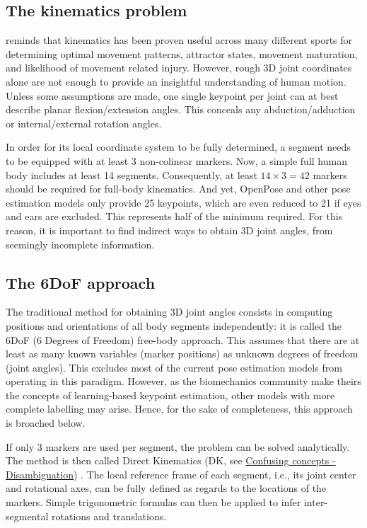 \subsection{The kinematics problem}

\cite{Robertson2013} reminds that kinematics has been proven useful across many different sports for determining optimal movement patterns, attractor states, movement maturation, and likelihood of movement related injury. However, rough 3D joint coordinates alone are not enough to provide an insightful understanding of human motion. Unless some assumptions are made, one single keypoint per joint can at best describe planar flexion/extension angles. This conceals any abduction/adduction or internal/external rotation angles. 

In order for its local coordinate system to be fully determined, a segment needs to be equipped with at least 3 non-colinear markers. Now, a simple full human body includes at least 14 segments. Consequently, at least $14 \times 3 = 42$ markers should be required for full-body kinematics. And yet, OpenPose and other pose estimation models only provide 25 keypoints, which are even reduced to 21 if eyes and ears are excluded. This represents half of the minimum required. For this reason, it is important to find indirect ways to obtain 3D joint angles, from seemingly incomplete information.


\subsection{The 6DoF approach}

The traditional method for obtaining 3D joint angles consists in computing positions and orientations of all body segments independently: it is called the 6DoF (6 Degrees of Freedom) free-body approach. This assumes that there are at least as many known variables (marker positions) as unknown degrees of freedom (joint angles). This excludes most of the current pose estimation models from operating in this paradigm. However, as the biomechanics community make theirs the concepts of learning-based keypoint estimation, other models with more complete labelling may arise. Hence, for the sake of completeness, this approach is broached below.

If only 3 markers are used per segment, the problem can be solved analytically. The method is then called Direct Kinematics (DK, see \href{Ann:gloss}{Confusing concepts - Disambiguation}) \cite{Lu1999}. The local reference frame of each segment, i.e., its joint center and rotational axes, can be fully defined as regards to the locations of the markers. Simple trigonometric formulas can then be applied to infer inter-segmental rotations and translations. 

